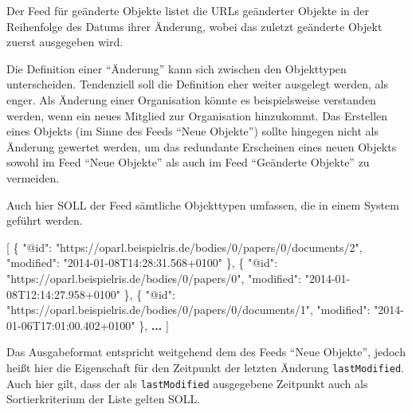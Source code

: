 \documentclass[,a4paper]{article}
\newenvironment{Shaded}{}{}
\newcommand{\DataTypeTok}[1]{\textcolor[rgb]{0.56,0.13,0.00}{{#1}}}
\newcommand{\StringTok}[1]{\textcolor[rgb]{0.25,0.44,0.63}{{#1}}}
\newcommand{\OtherTok}[1]{\textcolor[rgb]{0.00,0.44,0.13}{{#1}}}
\newcommand{\FunctionTok}[1]{\textcolor[rgb]{0.02,0.16,0.49}{{#1}}}
\newcommand{\ErrorTok}[1]{\textcolor[rgb]{1.00,0.00,0.00}{\textbf{{#1}}}}
\begin{document}

Der Feed für geänderte Objekte listet die URLs geänderter Objekte in der
Reihenfolge des Datums ihrer Änderung, wobei das zuletzt geänderte
Objekt zuerst ausgegeben wird.

Die Definition einer ``Änderung'' kann sich zwischen den Objekttypen
unterscheiden. Tendenziell soll die Definition eher weiter ausgelegt
werden, als enger. Als Änderung einer Organisation könnte es
beispielsweise verstanden werden, wenn ein neues Mitglied zur
Organisation hinzukommt. Das Erstellen eines Objekts (im Sinne des Feeds
``Neue Objekte'') sollte hingegen nicht als Änderung gewertet werden, um
das redundante Erscheinen eines neuen Objekts sowohl im Feed ``Neue
Objekte'' als auch im Feed ``Geänderte Objekte'' zu vermeiden.

Auch hier SOLL der Feed sämtliche Objekttypen umfassen, die in einem
System geführt werden.

\begin{Shaded}
\begin{Highlighting}[]
\OtherTok{[}
    \FunctionTok{\{}
        \DataTypeTok{"@id"}\FunctionTok{:} \StringTok{"https://oparl.beispielris.de/bodies/0/papers/0/documents/2"}\FunctionTok{,}
        \DataTypeTok{"modified"}\FunctionTok{:} \StringTok{"2014-01-08T14:28:31.568+0100"}
    \FunctionTok{\}}\OtherTok{,}
    \FunctionTok{\{}
        \DataTypeTok{"@id"}\FunctionTok{:} \StringTok{"https://oparl.beispielris.de/bodies/0/papers/0"}\FunctionTok{,}
        \DataTypeTok{"modified"}\FunctionTok{:} \StringTok{"2014-01-08T12:14:27.958+0100"}
    \FunctionTok{\}}\OtherTok{,}
    \FunctionTok{\{}
        \DataTypeTok{"@id"}\FunctionTok{:} \StringTok{"https://oparl.beispielris.de/bodies/0/papers/0/documents/1"}\FunctionTok{,}
        \DataTypeTok{"modified"}\FunctionTok{:} \StringTok{"2014-01-06T17:01:00.402+0100"}
    \FunctionTok{\}}\OtherTok{,}
    \ErrorTok{...}
\OtherTok{]}
\end{Highlighting}
\end{Shaded}

Das Ausgabeformat entspricht weitgehend dem des Feeds ``Neue Objekte'',
jedoch heißt hier die Eigenschaft für den Zeitpunkt der letzten Änderung
\texttt{lastModified}. Auch hier gilt, dass der als
\texttt{lastModified} ausgegebene Zeitpunkt auch als Sortierkriterium
der Liste gelten SOLL.
\end{document}
